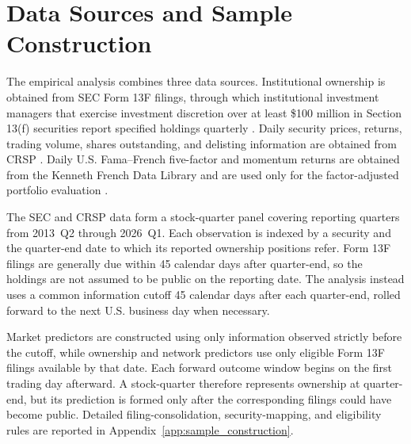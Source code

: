 \section{Data Sources and Sample Construction}
\label{sec:data_sources}

The empirical analysis combines three data sources. Institutional ownership is obtained from SEC Form 13F filings, through which institutional investment managers that exercise investment discretion over at least \$100 million in Section 13(f) securities report specified holdings quarterly \parencite{sec2023form13f}. Daily security prices, returns, trading volume, shares outstanding, and delisting information are obtained from CRSP \parencite{crsp2026stock}. Daily U.S. Fama--French five-factor and momentum returns are obtained from the Kenneth French Data Library and are used only for the factor-adjusted portfolio evaluation \parencite{fama2015five,carhart1997persistence,french2026library}.

The SEC and CRSP data form a stock-quarter panel covering reporting quarters from 2013~Q2 through 2026~Q1. Each observation is indexed by a security and the quarter-end date to which its reported ownership positions refer. Form 13F filings are generally due within 45 calendar days after quarter-end, so the holdings are not assumed to be public on the reporting date. The analysis instead uses a common information cutoff 45 calendar days after each quarter-end, rolled forward to the next U.S. business day when necessary.

Market predictors are constructed using only information observed strictly before the cutoff, while ownership and network predictors use only eligible Form 13F filings available by that date. Each forward outcome window begins on the first trading day afterward. A stock-quarter therefore represents ownership at quarter-end, but its prediction is formed only after the corresponding filings could have become public. Detailed filing-consolidation, security-mapping, and eligibility rules are reported in Appendix~\ref{app:sample_construction}.